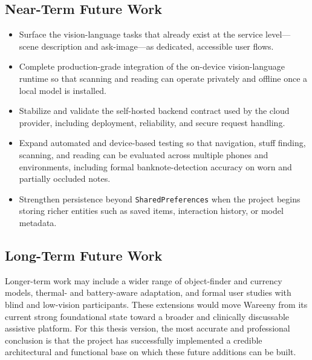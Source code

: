 \documentclass[12pt,a4paper]{report}
\begin{document}
\subsection{Near-Term Future Work}
\begin{itemize}
  \item Surface the vision-language tasks that already exist at the service level---scene description and ask-image---as dedicated, accessible user flows.
  \item Complete production-grade integration of the on-device vision-language runtime so that scanning and reading can operate privately and offline once a local model is installed.
  \item Stabilize and validate the self-hosted backend contract used by the cloud provider, including deployment, reliability, and secure request handling.
  \item Expand automated and device-based testing so that navigation, stuff finding, scanning, and reading can be evaluated across multiple phones and environments, including formal banknote-detection accuracy on worn and partially occluded notes.
  \item Strengthen persistence beyond \texttt{SharedPreferences} when the project begins storing richer entities such as saved items, interaction history, or model metadata.
\end{itemize}

\subsection{Long-Term Future Work}
Longer-term work may include a wider range of object-finder and currency models, thermal- and battery-aware adaptation, and formal user studies with blind and low-vision participants. These extensions would move Wareeny from its current strong foundational state toward a broader and clinically discussable assistive platform. For this thesis version, the most accurate and professional conclusion is that the project has successfully implemented a credible architectural and functional base on which these future additions can be built.
\end{document}
